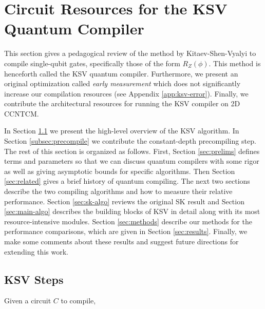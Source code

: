 \section{Circuit Resources for the KSV Quantum Compiler}
\label{sec:ksv-resources}

This section gives a pedagogical review of the method by
Kitaev-Shen-Vyalyi \cite{Kitaev2002} to compile single-qubit gates,
specifically those of the form $R_Z(\phi)$. This method is henceforth
called the KSV quantum compiler. Furthermore, we present an
original optimization
called \emph{early measurement} which does not significantly increase
our compilation resources (see Appendix \ref{app:ksv-error}).
Finally, we contribute the architectural resources for running the KSV
compiler on \textsf{2D CCNTCM}.

In Section \ref{subsec:ksv-steps} we present the high-level overview
of the KSV algorithm. In Section \ref{subsec:precompile} we contribute
the constant-depth precompiling step. 
The rest of this section is organized as follows.
First, Section \ref{sec:prelims} defines terms and parameters
so that we can discuss quantum compilers with some rigor as well as
giving asymptotic bounds for specific algorithms.
Then Section
\ref{sec:related} gives a brief history of quantum compiling.
The next two sections describe the two compiling algorithms and how
to measure their relative performance.
Section \ref{sec:sk-algo} reviews the original SK result and
Section \ref{sec:main-algo} describes the building blocks of KSV in detail
along with its
most resource-intensive modules. Section \ref{sec:methods} describe
our methods for the performance comparisons, which are given in Section
\ref{sec:results}. Finally, we make some comments about these results
and suggest future directions for extending this work.

\subsection{KSV Steps}
\label{subsec:ksv-steps}

Given a circuit $C$ to compile,

